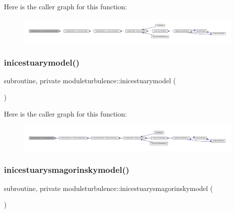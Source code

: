 Here is the caller graph for this function\+:\nopagebreak
\begin{figure}[H]
\begin{center}
\leavevmode
\includegraphics[width=350pt]{namespacemoduleturbulence_a2cecb8eb2b3e94ef70af30650d368ef8_icgraph}
\end{center}
\end{figure}
\mbox{\label{namespacemoduleturbulence_ad65bc066b505edcac467325fc067aa87}} 
\subsubsection{\texorpdfstring{inicestuarymodel()}{inicestuarymodel()}}
{\footnotesize\ttfamily subroutine, private moduleturbulence\+::inicestuarymodel (\begin{DoxyParamCaption}{ }\end{DoxyParamCaption})\hspace{0.3cm}{\ttfamily [private]}}

Here is the caller graph for this function\+:\nopagebreak
\begin{figure}[H]
\begin{center}
\leavevmode
\includegraphics[width=350pt]{namespacemoduleturbulence_ad65bc066b505edcac467325fc067aa87_icgraph}
\end{center}
\end{figure}
\mbox{\label{namespacemoduleturbulence_a7dcc612b541b2355f6ee7df80ef63634}} 
\subsubsection{\texorpdfstring{inicestuarysmagorinskymodel()}{inicestuarysmagorinskymodel()}}
{\footnotesize\ttfamily subroutine, private moduleturbulence\+::inicestuarysmagorinskymodel (\begin{DoxyParamCaption}{ }\end{DoxyParamCaption})\hspace{0.3cm}{\ttfamily [private]}}


